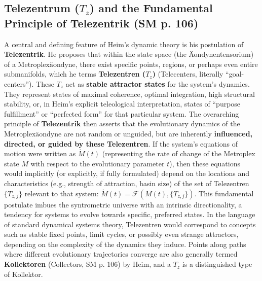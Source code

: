\documentclass[
    12pt,              %
    a4paper,           %
    headings=normal,   %
    twoside=true,      %
    BCOR=8mm,          %
]{scrbook}
\newcommand{\q}[1]{\enquote{#1}}
\newcommand{\metroplexaeondyne}{\text{Metroplexäondyne}}
\newcommand{\telezentrum}{T_z}
\begin{document}
\subsection{Telezentrum (\(\telezentrum\)) and the Fundamental Principle of Telezentrik (SM p. 106)}
\label{sec:ch6_telezentrum_telezentrik}
A central and defining feature of Heim’s dynamic theory is his postulation of \textbf{Telezentrik}. He proposes that within the state space (the Äondynentensorium) of a \(\metroplexaeondyne\), there exist specific points, regions, or perhaps even entire submanifolds, which he terms \textbf{Telezentren (\(\telezentrum\))} (Telecenters, literally \q{goal-centers}). These \(\telezentrum\) act as \textbf{stable attractor states} for the system’s dynamics. They represent states of maximal coherence, optimal integration, high structural stability, or, in Heim’s explicit teleological interpretation, states of \q{purpose fulfillment} or \q{perfected form} for that particular system.
The overarching principle of \textbf{Telezentrik} then asserts that the evolutionary dynamics of the \(\metroplexaeondyne\) are not random or unguided, but are inherently \textbf{influenced, directed, or guided by these Telezentren}. If the system’s equations of motion were written as \(\dot{M}(t)\) (representing the rate of change of the Metroplex state \(M\) with respect to the evolutionary parameter \(t\)), then these equations would implicitly (or explicitly, if fully formulated) depend on the locations and characteristics (e.g., strength of attraction, basin size) of the set of Telezentren \(\{T_{z,j}\}\) relevant to that system: \(\dot{M}(t) = \mathcal{F}(M(t), \{T_{z,j}\})\). This fundamental postulate imbues the syntrometric universe with an intrinsic directionality, a tendency for systems to evolve towards specific, preferred states. In the language of standard dynamical systems theory, Telezentren would correspond to concepts such as stable fixed points, limit cycles, or possibly even strange attractors, depending on the complexity of the dynamics they induce. Points along paths where different evolutionary trajectories converge are also generally termed \textbf{Kollektoren} (Collectors, SM p. 106) by Heim, and a \(\telezentrum\) is a distinguished type of Kollektor.
\end{document}
